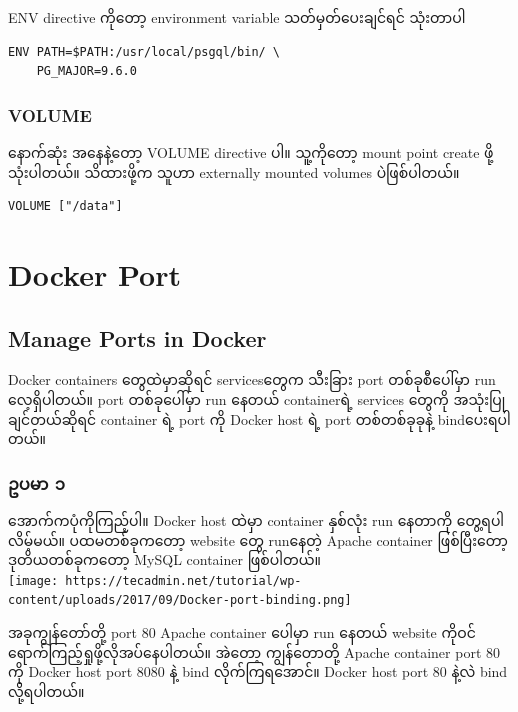 \documentclass{article}
\begin{document}
ENV directive ကို​တော့ environment variable သတ်​မှတ်​​ပေးချင်​ရင်​
သုံးတာပါ

\begin{verbatim}
ENV PATH=$PATH:/usr/local/psgql/bin/ \
    PG_MAJOR=9.6.0
\end{verbatim}

\subsubsection{VOLUME}\label{volume}

​နောက်​ဆုံး အ​နေနဲ့​တော့ VOLUME directive ပါ။ သူ့ကို​တော့ mount point
create ဖို့ သုံးပါတယ်​။ သိထားဖို့က သူဟာ externally mounted volumes
ပဲဖြစ်​ပါတယ်​။

\begin{verbatim}
VOLUME ["/data"]
\end{verbatim}

\pagebreak


\section{Docker Port}\label{docker-port}

\subsection{Manage Ports in Docker}\label{manage-ports-in-docker}

Docker containers တွေထဲမှာဆိုရင် servicesတွေက သီးခြား port
တစ်ခုစီပေါ်မှာ run လေ့ရှိပါတယ်။ port တစ်ခုပေါ်မှာ run နေတယ် containerရဲ့
services ‌တွေကို အသုံးပြုချင်တယ်ဆိုရင် container ရဲ့ port ကို Docker
host ရဲ့ port တစ်တစ်ခုခုနဲ့ bindပေးရပါတယ်။

\subsubsection{ဥပမာ ၁}

အောက်‌ကပုံကိုကြည့်ပါ။ Docker host ထဲမှာ container နှစ်လုံး run နေတာကို
တွေ့ရပါလိမ့်မယ်။ ပထမတစ်ခုကတော့ website တွေ runနေတဲ့ Apache container
ဖြစ်ပြီးတော့ ဒုတိယတစ်ခုကတော့ MySQL container
ဖြစ်ပါတယ်။\\\texttt{[image: https://tecadmin.net/tutorial/wp-content/uploads/2017/09/Docker-port-binding.png]}

အခုကျွန်တော်တို့ port 80 Apache container ပေါမှာ run နေတယ် website
ကိုဝင်ရောက်ကြည့်ရှုဖို့လိုအပ်နေပါတယ်။ အဲတော့ ကျွန်တောတို့ Apache
container port 80 ကို Docker host port 8080 နဲ့ bind လိုက်ကြရအောင်။
Docker host port 80 နဲ့လဲ bind လို့ရပါတယ်။
\end{document}
